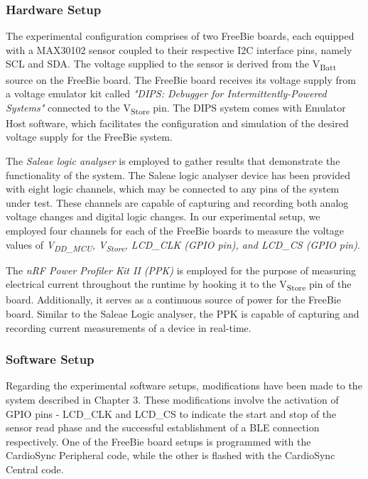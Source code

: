 \subsubsection{Hardware Setup}
The experimental configuration comprises of two FreeBie boards, each equipped with a MAX30102 sensor coupled to their respective I2C interface pins, namely SCL and SDA. The voltage supplied to the sensor is derived from the V\textsubscript{Batt} source on the FreeBie board. The FreeBie board receives its voltage supply from a voltage emulator kit called \textit{"DIPS: Debugger for Intermittently-Powered Systems"} connected to the V\textsubscript{Store} pin. The DIPS system comes with Emulator Host software, which facilitates the configuration and simulation of the desired voltage supply for the FreeBie system.

\noindent The \textit{Saleae logic analyser} is employed to gather results that demonstrate the functionality of the system. The Saleae logic analyser device has been provided with eight logic channels, which may be connected to any pins of the system under test. These channels are capable of capturing and recording both analog voltage changes and digital logic changes. In our experimental setup, we employed four channels for each of the FreeBie boards to measure the voltage values of \textit{V\textsubscript{DD\_MCU}, V\textsubscript{Store}, LCD\_CLK (GPIO pin), and LCD\_CS (GPIO pin)}.

\noindent The \textit{nRF Power Profiler Kit II (PPK)} is employed for the purpose of measuring electrical current throughout the runtime by hooking it to the V\textsubscript{Store} pin of the board. Additionally, it serves as a continuous source of power for the FreeBie board. Similar to the Saleae Logic analyser, the PPK is capable of capturing and recording current measurements of a device in real-time.

\subsubsection{Software Setup}
Regarding the experimental software setups, modifications have been made to the system described in Chapter 3. These modifications involve the activation of GPIO pins - LCD\_CLK and LCD\_CS to indicate the start and stop of the sensor read phase and the successful establishment of a BLE connection respectively. One of the FreeBie board setups is programmed with the CardioSync Peripheral code, while the other is flashed with the CardioSync Central code.

